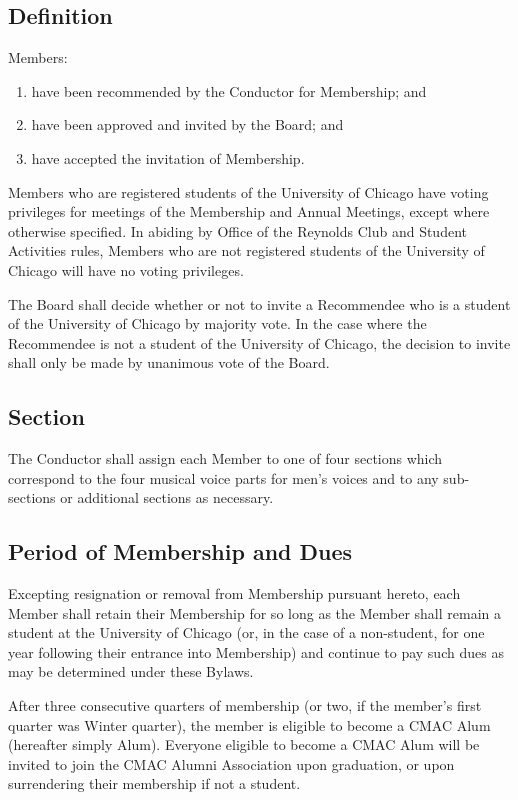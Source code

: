 \documentclass{article}
\begin{document}
\subsection{Definition}

Members:
\begin{enumerate}
  \item have been recommended by the Conductor for Membership; and
  \item have been approved and invited by the Board; and
  \item have accepted the invitation of Membership.
\end{enumerate}
Members who are registered students of the University of Chicago have voting
privileges for meetings of the Membership and Annual Meetings, except where
otherwise specified.  In abiding by Office of the Reynolds Club and Student
Activities rules, Members who are not registered students of the University of
Chicago will have no voting privileges.

The Board shall decide whether or not to invite a Recommendee who is a student
of the University of Chicago by majority vote. In the case where the Recommendee
is not a student of the University of Chicago, the decision to invite shall only
be made by unanimous vote of the Board.

\subsection{Section}

The Conductor shall assign each Member to one of four sections which
correspond to the four musical voice parts for men's voices and to
any sub-sections or additional sections as necessary.

\subsection{Period of Membership and Dues}

Excepting resignation or removal from Membership pursuant hereto,
each Member shall retain their Membership for so long as the Member shall remain
a student at the University of Chicago (or, in the case of a non-student,
for one year following their entrance into Membership) and continue
to pay such dues as may be determined under these Bylaws.

After three consecutive quarters of membership (or two, if the member's first
quarter was Winter quarter), the member is eligible to become a CMAC Alum
(hereafter simply Alum). Everyone eligible to become a CMAC Alum will be invited
to join the CMAC Alumni Association upon graduation, or upon surrendering their
membership if not a student.
\end{document}
